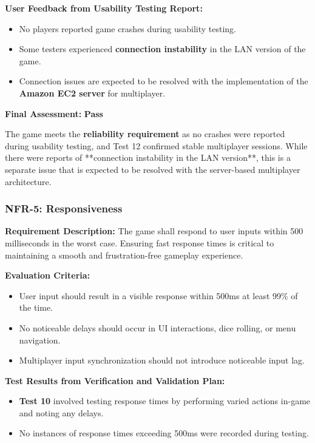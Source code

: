 \documentclass[12pt, titlepage]{article}
\begin{document}
\textbf{User Feedback from Usability Testing Report:}  
\begin{itemize}
    \item No players reported game crashes during usability testing.
    \item Some testers experienced \textbf{connection instability} in the LAN version of the game.
    \item Connection issues are expected to be resolved with the implementation of the \textbf{Amazon EC2 server} for multiplayer.
\end{itemize}

\textbf{Final Assessment:} \textbf{Pass}  

The game meets the \textbf{reliability requirement} as no crashes were reported during usability testing, and Test 12 confirmed stable multiplayer sessions. While there were reports of **connection instability in the LAN version**, this is a separate issue that is expected to be resolved with the server-based multiplayer architecture.


\subsubsection{NFR-5: Responsiveness}
\label{NFR5}

\textbf{Requirement Description:}  
The game shall respond to user inputs within 500 milliseconds in the worst case. Ensuring fast response times is critical to maintaining a smooth and frustration-free gameplay experience.

\textbf{Evaluation Criteria:}  
\begin{itemize}
    \item User input should result in a visible response within 500ms at least 99\% of the time.
    \item No noticeable delays should occur in UI interactions, dice rolling, or menu navigation.
    \item Multiplayer input synchronization should not introduce noticeable input lag.
\end{itemize}

\textbf{Test Results from Verification and Validation Plan:}  
\begin{itemize}
    \item \textbf{Test 10} involved testing response times by performing varied actions in-game and noting any delays.
    \item No instances of response times exceeding 500ms were recorded during testing.
\end{itemize}
\end{document}
